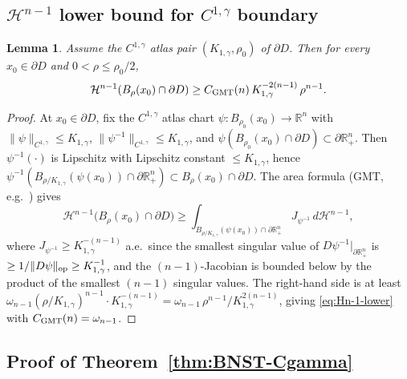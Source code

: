 \documentclass[11pt]{amsart}
\newtheorem{lemma}[theorem]{Lemma}
\newcommand{\R}{\mathbb R}
\begin{document}
\subsection{$\mathcal H^{n-1}$ lower bound for $C^{1,\gamma}$ boundary}
\label{ss:Hn-1-Cgamma}

\begin{lemma}\label{lem:Hn-1-lower}
Assume the $C^{1,\gamma}$ atlas pair $(K_{1,\gamma},\rho_0)$ of
$\partial D$.  Then for every $x_0\in\partial D$ and
$0<\rho\le\rho_0/2$,
\begin{equation}\label{eq:Hn-1-lower}
   \mathcal H^{n-1}(B_\rho(x_0)\cap\partial D)
   \ge C_{\rm GMT}(n)\,K_{1,\gamma}^{-2(n-1)}\,\rho^{n-1}.
\end{equation}
\end{lemma}

\begin{proof}
At $x_0\in\partial D$, fix the $C^{1,\gamma}$ atlas chart
$\psi:B_{\rho_0}(x_0)\to\R^n$ with $\|\psi\|_{C^{1,\gamma}}\le
K_{1,\gamma}$, $\|\psi^{-1}\|_{C^{1,\gamma}}\le K_{1,\gamma}$, and
$\psi(B_{\rho_0}(x_0)\cap\partial D)\subset\partial\R^n_+$.  Then
$\psi^{-1}(\cdot)$ is Lipschitz with Lipschitz constant $\le
K_{1,\gamma}$, hence $\psi^{-1}(B_{\rho/K_{1,\gamma}}(\psi(x_0))\cap
\partial\R^n_+)\subset B_\rho(x_0)\cap\partial D$.  The area formula
\textup{(GMT, e.g.~\cite[Theorem~8.5]{HP})} gives
\[
\mathcal H^{n-1}\bigl(B_\rho(x_0)\cap\partial D\bigr)
\ge\int_{B_{\rho/K_{1,\gamma}}(\psi(x_0))\cap\partial\R^n_+}
   J_{\psi^{-1}}\,d\mathcal H^{n-1},
\]
where $J_{\psi^{-1}}\ge K_{1,\gamma}^{-(n-1)}$ a.e.\ since the
smallest singular value of $D\psi^{-1}|_{\partial\R^n_+}$ is
$\ge 1/\|D\psi\|_{\rm op}\ge K_{1,\gamma}^{-1}$, and the
$(n-1)$-Jacobian is bounded below by the product of the smallest
$(n-1)$ singular values.  The right-hand side is at least
$\omega_{n-1}(\rho/K_{1,\gamma})^{n-1}\cdot K_{1,\gamma}^{-(n-1)}=
\omega_{n-1}\,\rho^{n-1}/K_{1,\gamma}^{2(n-1)}$, giving
\eqref{eq:Hn-1-lower} with $C_{\rm GMT}(n)=\omega_{n-1}$.
\end{proof}

\subsection{Proof of Theorem~\ref{thm:BNST-Cgamma}}
\label{ss:BNST-Cgamma-proof}
\end{document}
